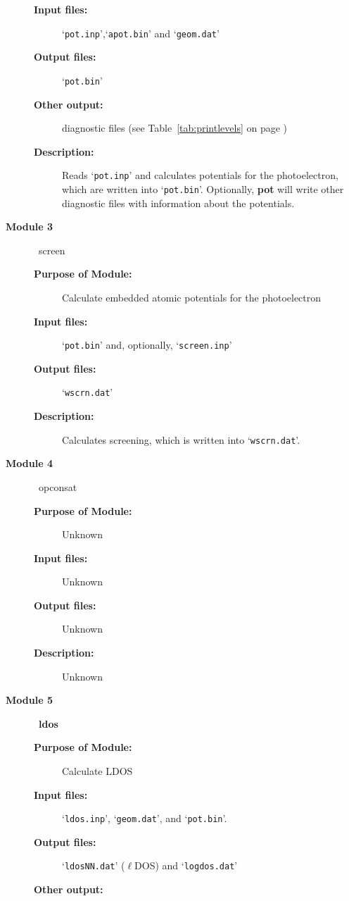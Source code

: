 \documentclass[11pt,oneside]{report} %
\newcommand{\file}[1]{`\texttt{#1}'}
\newcommand{\module}[1]{\textrm{\bf{#1}}}
\begin{document}
\begin{latexonly}
\begin{description}
\begin{description}
  \item[\textbf{Input files:}] \file{pot.inp},\file{apot.bin} and \file{geom.dat}
  \item[\textbf{Output files:}] \file{pot.bin}
  \item[\textbf{Other output:}] diagnostic files (see
    Table~\ref{tab:printlevels} on page \pageref{tab:printlevels})
  \item[\textbf{Description:}] Reads \file{pot.inp} and calculates potentials
    for the photoelectron, which are written into \file{pot.bin}.
    Optionally, \module{pot} will write other diagnostic files with information
    about the potentials.
  \end{description}
\item [\large\textbf{Module 3}]\dotfill\  {\large\textrm{screen}}
  \begin{description}
  \item[\textbf{Purpose of Module:}] Calculate embedded atomic
    potentials for the photoelectron
  \item[\textbf{Input files:}] \file{pot.bin} and, optionally, \file{screen.inp}
  \item[\textbf{Output files:}] \file{wscrn.dat}
  \item[\textbf{Description:}] Calculates screening, which is written into \file{wscrn.dat}.
  \end{description}
\item [\large\textbf{Module 4}]\dotfill\  {\large\textrm{opconsat}}
  \begin{description}
  \item[\textbf{Purpose of Module:}] Unknown
  \item[\textbf{Input files:}] Unknown
  \item[\textbf{Output files:}] Unknown
  \item[\textbf{Description:}] Unknown
  \end{description}
\item[\large\textbf{Module 5}]\dotfill\  {\large\module{ldos}}
  \begin{description}
  \item[\textbf{Purpose of Module:}] Calculate LDOS
  \item[\textbf{Input files:}] \file{ldos.inp}, \file{geom.dat}, 
    and \file{pot.bin}.
  \item[\textbf{Output files:}] \file{ldosNN.dat} ($\ell$DOS) and 
    \file{logdos.dat}
  \item[\textbf{Other output:}] 

\end{description}
\end{description}
\end{latexonly}
\end{document}
